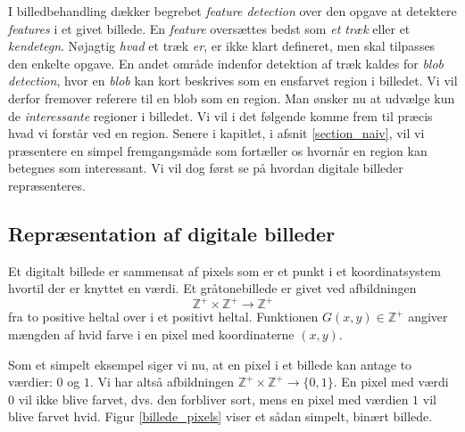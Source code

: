 {
{\sffamily I billedbehandling dækker begrebet \emph{feature detection}
over den opgave at detektere \emph{features} i et givet billede. En
\emph{feature} oversættes bedst som \emph{et træk} eller et
\emph{kendetegn}. Nøjagtig \emph{hvad} et træk \emph{er}, er ikke klart
defineret, men skal tilpasses den enkelte opgave. En andet område
indenfor detektion af træk kaldes for \emph{blob detection}, hvor en
\emph{blob} kan kort beskrives som en ensfarvet region i billedet. Vi
vil derfor fremover referere til en blob som en region. Man ønsker nu at
udvælge kun de \emph{interessante} regioner i billedet. Vi vil i det
følgende komme frem til præcis hvad vi forstår ved en region. Senere i
kapitlet, i afsnit \ref{section_naiv}, vil vi præsentere en simpel
fremgangsmåde som fortæller os hvornår en region kan betegnes som
interessant. Vi vil dog først se på hvordan digitale billeder
repræsenteres.
}

\subsection{Repræsentation af digitale billeder}
Et digitalt billede er sammensat af pixels som er et punkt i et
koordinatsystem hvortil der er knyttet en værdi. Et gråtonebillede er
givet ved afbildningen
\begin{equation}
    \mathbb{Z}^{+}\times{} \mathbb{Z}^{+} \rightarrow \mathbb{Z}^{+}
\end{equation}
fra to positive heltal over i et positivt heltal.
Funktionen $G(x, y) \in \mathbb{Z}^{+}$ angiver mængden af hvid farve i
en pixel med koordinaterne $(x, y)$.

Som et simpelt eksempel siger vi nu, at en pixel i et billede kan antage
to værdier: $0$ og $1$. Vi har altså afbildningen $\mathbb{Z}^{+}\times{}
\mathbb{Z}^{+} \rightarrow \{0, 1\}$. En pixel med værdi $0$ vil ikke
blive farvet, dvs. den forbliver sort, mens en pixel med værdien $1$ vil
blive farvet hvid.  Figur \ref{billede_pixels} viser et sådan simpelt,
binært billede.

}
